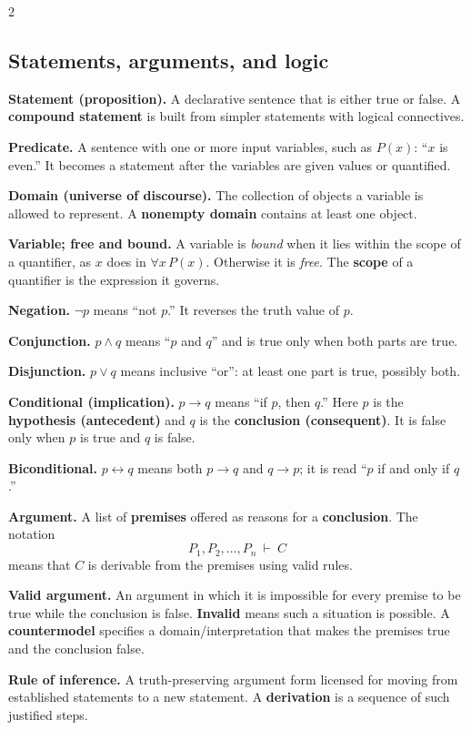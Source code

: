 \documentclass[10pt]{article}
\newcommand{\term}[1]{\textbf{\color{ProofNavy}#1}}
\begin{document}
\begin{multicols}{2}
\raggedcolumns
\subsection*{Statements, arguments, and logic}

\term{Statement (proposition).} A declarative sentence that is either true or
false. A \term{compound statement} is built from simpler statements with
logical connectives.

\term{Predicate.} A sentence with one or more input variables, such as
$P(x)$: ``$x$ is even.'' It becomes a statement after the variables are given
values or quantified.

\term{Domain (universe of discourse).} The collection of objects a variable is
allowed to represent. A \term{nonempty domain} contains at least one object.

\term{Variable; free and bound.} A variable is \emph{bound} when it lies within
the scope of a quantifier, as $x$ does in $\forall x\,P(x)$. Otherwise it is
\emph{free}. The \term{scope} of a quantifier is the expression it governs.

\term{Negation.} $\neg p$ means ``not $p$.'' It reverses the truth value of
$p$.

\term{Conjunction.} $p\land q$ means ``$p$ and $q$'' and is true only when both
parts are true.

\term{Disjunction.} $p\lor q$ means inclusive ``or'': at least one part is
true, possibly both.

\term{Conditional (implication).} $p\to q$ means ``if $p$, then $q$.'' Here
$p$ is the \term{hypothesis (antecedent)} and $q$ is the
\term{conclusion (consequent)}. It is false only when $p$ is true and $q$ is
false.

\term{Biconditional.} $p\leftrightarrow q$ means both $p\to q$ and $q\to p$;
it is read ``$p$ if and only if $q$.''

\term{Argument.} A list of \term{premises} offered as reasons for a
\term{conclusion}. The notation
\[
  P_1,P_2,\ldots,P_n\ \vdash\ C
\]
means that $C$ is derivable from the premises using valid rules.

\term{Valid argument.} An argument in which it is impossible for every premise
to be true while the conclusion is false. \term{Invalid} means such a situation
is possible. A \term{countermodel} specifies a domain/interpretation that makes
the premises true and the conclusion false.

\term{Rule of inference.} A truth-preserving argument form licensed for moving
from established statements to a new statement. A \term{derivation} is a
sequence of such justified steps.


\end{multicols}
\end{document}
